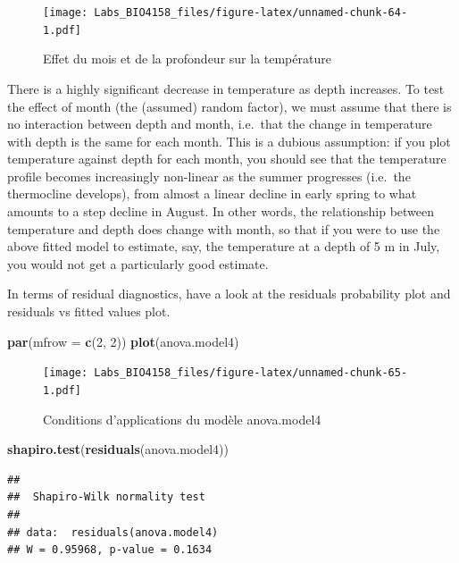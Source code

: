 \documentclass[
  12pt,
]{book}
\newenvironment{Shaded}{\begin{snugshade}}{\end{snugshade}}
\newcommand{\DataTypeTok}[1]{\textcolor[rgb]{0.13,0.29,0.53}{#1}}
\newcommand{\DecValTok}[1]{\textcolor[rgb]{0.00,0.00,0.81}{#1}}
\newcommand{\KeywordTok}[1]{\textcolor[rgb]{0.13,0.29,0.53}{\textbf{#1}}}
\newcommand{\NormalTok}[1]{#1}
\begin{document}
\begin{figure}
\centering
\texttt{[image: Labs\_BIO4158\_files/figure-latex/unnamed-chunk-64-1.pdf]}
\caption{\label{fig:unnamed-chunk-64}Effet du mois et de la profondeur sur la température}
\end{figure}

There is a highly significant decrease in temperature as depth increases. To test the effect of month (the (assumed) random factor), we must assume that there is no interaction between depth and month, i.e.~that the change in temperature with depth is the same for each month. This is a dubious assumption: if you plot temperature against depth for each month, you should see that the temperature profile becomes increasingly non-linear as the summer progresses (i.e.~the thermocline develops), from almost a linear decline in early spring to what amounts to a step decline in August. In other words, the relationship between temperature and depth does change with month, so that if you were to use the above fitted model to estimate, say, the temperature at a depth of 5 m in July, you would not get a particularly good estimate.

In terms of residual diagnostics, have a look at the residuals probability plot and residuals vs fitted values plot.

\begin{Shaded}
\begin{Highlighting}[]
\KeywordTok{par}\NormalTok{(}\DataTypeTok{mfrow =} \KeywordTok{c}\NormalTok{(}\DecValTok{2}\NormalTok{, }\DecValTok{2}\NormalTok{))}
\KeywordTok{plot}\NormalTok{(anova.model4)}
\end{Highlighting}
\end{Shaded}

\begin{figure}
\centering
\texttt{[image: Labs\_BIO4158\_files/figure-latex/unnamed-chunk-65-1.pdf]}
\caption{\label{fig:unnamed-chunk-65}Conditions d'applications du modèle anova.model4}
\end{figure}

\begin{Shaded}
\begin{Highlighting}[]
\KeywordTok{shapiro.test}\NormalTok{(}\KeywordTok{residuals}\NormalTok{(anova.model4))}
\end{Highlighting}
\end{Shaded}

\begin{verbatim}
## 
##  Shapiro-Wilk normality test
## 
## data:  residuals(anova.model4)
## W = 0.95968, p-value = 0.1634
\end{verbatim}
\end{document}
